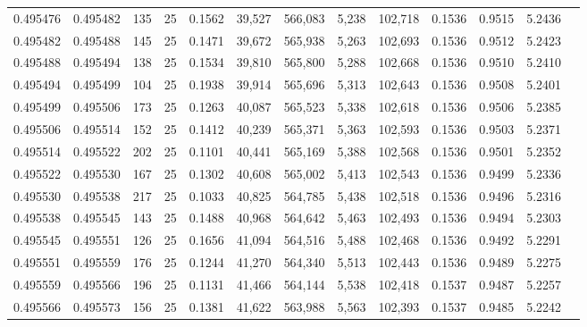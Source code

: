 \begin{tabular}{rrrrrrrrrrrrr}
0.495476 & 0.495482 & 135 &  25 &                                     0.1562 &  39,527 & 566,083 &   5,238 & 102,718 & 0.1536 & 0.9515 & 5.2436 \\
0.495482 & 0.495488 & 145 &  25 &                                     0.1471 &  39,672 & 565,938 &   5,263 & 102,693 & 0.1536 & 0.9512 & 5.2423 \\
0.495488 & 0.495494 & 138 &  25 &                                     0.1534 &  39,810 & 565,800 &   5,288 & 102,668 & 0.1536 & 0.9510 & 5.2410 \\
0.495494 & 0.495499 & 104 &  25 &                                     0.1938 &  39,914 & 565,696 &   5,313 & 102,643 & 0.1536 & 0.9508 & 5.2401 \\
0.495499 & 0.495506 & 173 &  25 &                                     0.1263 &  40,087 & 565,523 &   5,338 & 102,618 & 0.1536 & 0.9506 & 5.2385 \\
0.495506 & 0.495514 & 152 &  25 &                                     0.1412 &  40,239 & 565,371 &   5,363 & 102,593 & 0.1536 & 0.9503 & 5.2371 \\
0.495514 & 0.495522 & 202 &  25 &                                     0.1101 &  40,441 & 565,169 &   5,388 & 102,568 & 0.1536 & 0.9501 & 5.2352 \\
0.495522 & 0.495530 & 167 &  25 &                                     0.1302 &  40,608 & 565,002 &   5,413 & 102,543 & 0.1536 & 0.9499 & 5.2336 \\
0.495530 & 0.495538 & 217 &  25 &                                     0.1033 &  40,825 & 564,785 &   5,438 & 102,518 & 0.1536 & 0.9496 & 5.2316 \\
0.495538 & 0.495545 & 143 &  25 &                                     0.1488 &  40,968 & 564,642 &   5,463 & 102,493 & 0.1536 & 0.9494 & 5.2303 \\
0.495545 & 0.495551 & 126 &  25 &                                     0.1656 &  41,094 & 564,516 &   5,488 & 102,468 & 0.1536 & 0.9492 & 5.2291 \\
0.495551 & 0.495559 & 176 &  25 &                                     0.1244 &  41,270 & 564,340 &   5,513 & 102,443 & 0.1536 & 0.9489 & 5.2275 \\
0.495559 & 0.495566 & 196 &  25 &                                     0.1131 &  41,466 & 564,144 &   5,538 & 102,418 & 0.1537 & 0.9487 & 5.2257 \\
0.495566 & 0.495573 & 156 &  25 &                                     0.1381 &  41,622 & 563,988 &   5,563 & 102,393 & 0.1537 & 0.9485 & 5.2242 \\

\end{tabular}
